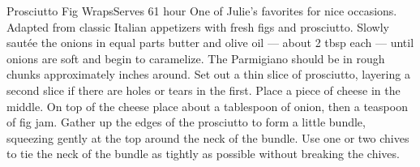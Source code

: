 \begin{recipe}{Prosciutto Fig Wraps}{Serves 6}{1 hour}
\freeform
One of Julie's favorites for nice occasions. Adapted from classic Italian appetizers with fresh figs and prosciutto.
\newstep
{}
Slowly saut\'{e}e the onions in equal parts butter and olive oil --- about 2 tbsp each --- until onions are soft and begin to caramelize. The Parmigiano should be in rough chunks approximately  inches around. Set out a thin slice of prosciutto, layering a second slice if there are holes or tears in the first. Place a piece of cheese in the middle. On top of the cheese place about a tablespoon of onion, then a teaspoon of fig jam. Gather up the edges of the prosciutto to form a little bundle, squeezing gently at the top around the neck of the bundle. Use one or two chives to tie the neck of the bundle as tightly as possible without breaking the chives.
\end{recipe}
